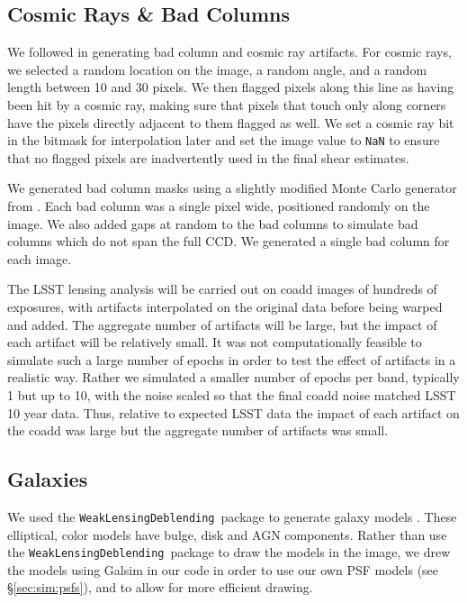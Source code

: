 \documentclass[twocolumn,twocolappendix,astrosym]{openjournal}
\newcommand{\descwl}{\texttt{WeakLensingDeblending}}
\begin{document}
\subsection{Cosmic Rays \& Bad Columns} \label{sec:sim:cosmics_badcols}

We followed \citet{BeckerMdetCoadd} in generating bad column and cosmic ray artifacts.
For cosmic rays, we selected a random location on the image, a random angle, and a random
length between 10 and 30 pixels. We then flagged pixels along this line as having been hit
by a cosmic ray, making sure that pixels that touch only along corners have the pixels
directly adjacent to them flagged as well. We set a cosmic ray bit in the bitmask for
interpolation later and set the image value to \texttt{NaN} to ensure that no flagged
pixels are inadvertently used in the final shear estimates.

We generated bad column masks using a slightly modified Monte Carlo generator
from \citet{BeckerMdetCoadd}. Each bad column was a single pixel wide,
positioned randomly on the image. We also added gaps at random to the bad
columns to simulate bad columns which do not span the full CCD.  We generated
a single bad column for each image.

The LSST lensing analysis will be carried out on coadd images of hundreds of
exposures, with artifacts interpolated on the original data before being warped
and added.  The aggregate number of artifacts will be large, but the impact of
each artifact will be relatively small.  It was not computationally feasible to
simulate such a large number of epochs in order to test the effect of artifacts
in a realistic way.  Rather we simulated a smaller number of epochs per
band, typically
1 but up to 10, with the noise scaled so that the final coadd noise matched
LSST 10 year data.  Thus, relative to expected LSST data the impact of each
artifact on the coadd was large but the aggregate number of artifacts was
small.

\subsection{Galaxies} \label{sec:sim:galaxies}

We used the \descwl\ package to generate galaxy models
\citep{DESCWLSanchez2021}.  These elliptical, color models have bulge, disk and
AGN components.  Rather than use the \descwl\ package to draw the models in the
image, we drew the models using Galsim in our code in order to use our own PSF
models (see \S \ref{sec:sim:psfs}), and to allow for more efficient drawing.
\end{document}

